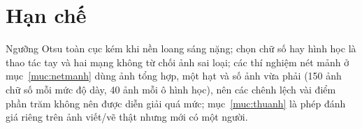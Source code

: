 \section{Hạn chế}
Ngưỡng Otsu toàn cục kém khi nền loang sáng nặng; chọn chữ số hay hình học là thao tác tay và hai mạng không từ chối ảnh sai loại; các thí nghiệm nét mảnh ở mục~\ref{muc:netmanh} dùng ảnh tổng hợp, một hạt và số ảnh vừa phải
(150 ảnh chữ số mỗi mức độ dày, 40 ảnh mỗi ô hình học), nên các chênh lệch vài điểm phần trăm không nên được diễn giải quá mức; mục~\ref{muc:thuanh} là phép đánh giá riêng trên ảnh viết/vẽ thật nhưng mới có một người.
